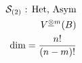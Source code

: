 \documentclass[preview]{standalone}
\begin{document}
\begin{align*}
\special{dvisvgm:raw <g id='unique000'>}\mathcal{S}_{(2)}\text{ : Het, Asym}\\V^{\underline{\otimes}m}(B)\\\dim = \frac{n!}{(n-m)!}\special{dvisvgm:raw </g>}
\end{align*}
\end{document}
